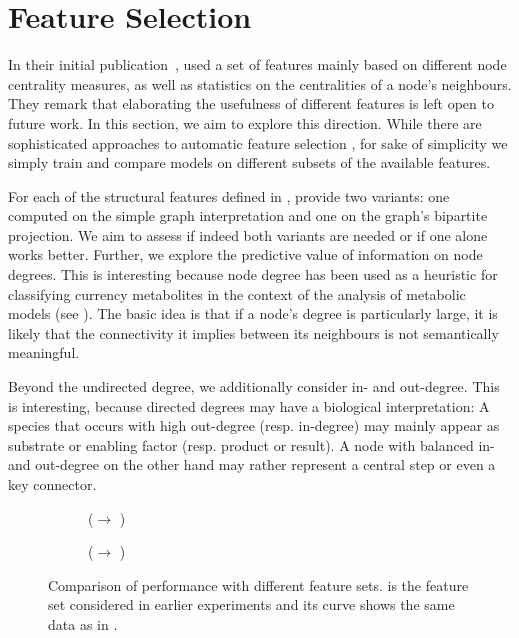 \documentclass[
	fontsize=10pt, %
	twoside=true, %
	secnumdepth=1, %
  toc=indentunnumbered %
]{kaobook}
\begin{document}
\section{Feature Selection}
\label{sec:feature-selection}

In their initial publication~\cite{nielsen_MachineLearningSupport_2019},
\nielsen{} used a set of features mainly based on different node centrality
measures, as well as statistics on the centralities of a node's neighbours. They
remark that elaborating the usefulness of different features is left open to
future work. In this section, we aim to explore this direction.
%
While there are sophisticated approaches to automatic feature selection  
\cite{saeys_ReviewFeatureSelection_2007},
for sake of simplicity we simply train and compare models on different subsets
of the available features.

For each of the structural features defined in , \nielsen{}
provide two variants: one computed on the simple graph interpretation and one on
the graph's bipartite projection. We aim to assess if indeed both variants are
needed or if one alone works better.
%
Further, we explore the predictive value of information on node degrees.
This is interesting because node degree has been used as a heuristic for
classifying currency metabolites in the context of the analysis of metabolic
models (see ). The basic idea is that if a node's
degree is particularly large, it is likely that the connectivity it implies
between its neighbours is not semantically meaningful.

Beyond the undirected degree, we additionally consider in- and out-degree. This
is interesting, because directed degrees may have a biological interpretation: A
species that occurs with high out-degree (resp. in-degree) may mainly appear as
substrate or enabling factor (resp. product or result). A node with balanced in-
and out-degree on the other hand may rather represent a central step or even a
key connector.


\begin{figure}[h]
  \centering
  \begin{subfigure}{0.48\linewidth}
    \caption{(\ADLast $\rightarrow$ \PDMap)}
  \end{subfigure}
  \begin{subfigure}{0.48\linewidth}
    \caption{(\ADLast $\rightarrow$ \ReconMap{})}
  \end{subfigure}
  \caption[Comparison of performance with different feature sets.]{Comparison of
    performance with different feature sets.  is the
    feature set considered in earlier experiments and its curve shows the same
    data as in .}
  \label{fig:feature-importance}
\end{figure}
\end{document}
